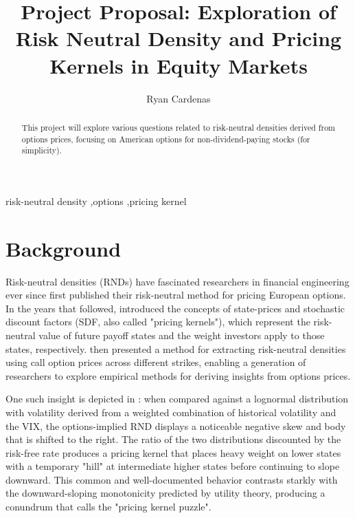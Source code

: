\documentclass[final,3p,times,authoryear]{elsarticle}
\begin{document}
\begin{frontmatter}

    \title{Project Proposal: Exploration of Risk Neutral Density and Pricing Kernels in Equity Markets}

    \author{Ryan Cardenas}

    \begin{abstract}
    This project will explore various questions related to risk-neutral densities derived from options prices, focusing on American options for non-dividend-paying stocks (for simplicity). 
    \end{abstract}

    \begin{keyword} %
    risk-neutral density \sep options \sep pricing kernel
    \end{keyword}
    
\end{frontmatter}


\section{Background}
  \label{background}
  Risk-neutral densities (RNDs) have fascinated researchers in financial engineering ever since \citet{black_pricing_1973} first published their risk-neutral method for pricing European options. In the years that followed, \citet{ross_arbitrage_1976} introduced the concepts of state-prices and stochastic discount factors (SDF, also called "pricing kernels"), which represent the risk-neutral value of future payoff states and the weight investors apply to those states, respectively. \citet{breeden_prices_1978} then presented a method for extracting risk-neutral densities using call option prices across different strikes, enabling a generation of researchers to explore empirical methods for deriving insights from options prices.

  One such insight is depicted in \citet{figlewski_risk-neutral_2018}: when compared against a lognormal distribution with volatility derived from a weighted combination of historical volatility and the VIX, the options-implied RND displays a noticeable negative skew and body that is shifted to the right. The ratio of the two distributions discounted by the risk-free rate produces a pricing kernel that places heavy weight on lower states with a temporary "hill" at intermediate higher states before continuing to slope downward. This common and well-documented behavior contrasts starkly with the downward-sloping monotonicity predicted by utility theory, producing a conundrum that \citet{jackwerth_option-implied_2004} calls the "pricing kernel puzzle".
\end{document}
